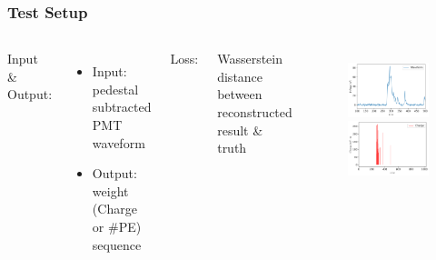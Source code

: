 \documentclass{beamer}
\begin{document}
\begin{frame}
\frametitle{Test Setup}
\begin{columns}
\hspace{4mm}Input \& Output:
\begin{itemize}
    \item Input: pedestal subtracted PMT waveform
    \item Output: weight (Charge or \#PE) sequence
\end{itemize}
\hspace{4mm}Loss:

\hspace{4mm}Wasserstein distance \\ \hspace{4mm}between reconstructed \\ \hspace{4mm}result \& truth
\setlength{\abovecaptionskip}{-2mm}
\setlength{\belowcaptionskip}{0mm}
\begin{figure}
    \centering
    \includegraphics[width=0.9\linewidth]{img/wave.png}
    \includegraphics[width=0.9\linewidth]{img/charge.png}
\end{figure}
\end{columns}
\end{frame}
\end{document}
